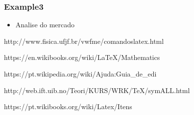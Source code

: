 \subsubsection{Example3}


\vphantom{}
\vspace{69mm}


\fontsize{15}{\baselineskip}\selectfont
{}



\begin{itemize}
   \item Analise do mercado
\end{itemize}












http://www.fisica.ufjf.br/vwfme/comandoslatex.html

https://en.wikibooks.org/wiki/LaTeX/Mathematics

https://pt.wikipedia.org/wiki/Ajuda:Guia\_de\_edi%

http://web.ift.uib.no/Teori/KURS/WRK/TeX/symALL.html

https://pt.wikibooks.org/wiki/Latex/Itens

